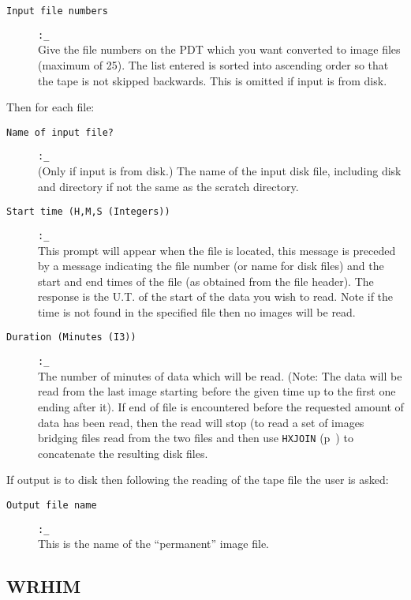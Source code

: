 \begin{description}
\item[{\tt Input file numbers }]{\tt :\_}\\
Give the file numbers on the PDT which you want converted to image
files (maximum of 25).  The list entered is sorted into ascending order
so that the tape is not skipped backwards. This is omitted if input is
from disk.
\end{description}

Then for each file:
\begin{description}
\item[{\tt Name of input file? }]{\tt :\_}\\
(Only if input is from disk.) The name of the input disk file,
including disk and directory if not the same as the scratch directory.

\item[{\tt Start time (H,M,S (Integers)) }]{\tt :\_}\\
This prompt will appear when the file is located, this message is
preceded by a message indicating the file number (or name for disk
files) and the start and end times of the file (as obtained from the
file header). The response is the U.T. of the start of the data you
wish to read. Note if the time is not found in the specified file then
no images will be read.

\item[{\tt Duration (Minutes (I3)) }]{\tt :\_}\\
The number of minutes of data which will be read. (Note: The data will
be read from the last image starting before the given time up to the
first one ending after it).  If end of file is encountered before the
requested amount of data has been read, then the read will stop (to
read a set of images bridging files read from the two files and then
use \verb!HXJOIN! (p~\pageref{HXJOIN}) to concatenate the resulting disk
files.
\end{description}

If output is to disk then following the reading of the tape file the
user is asked:
\begin{description}
\item[{\tt Output file name }]{\tt :\_}\\
This is the name of the ``permanent'' image file.
\end{description}

\subsection{WRHIM}
\label{WRHIM}

